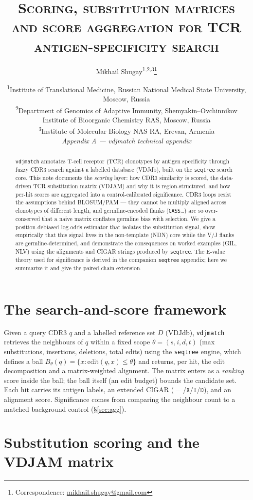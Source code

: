 \documentclass[11pt]{article}
\title{\scshape Scoring, substitution matrices and score aggregation for
TCR antigen-specificity search}
\author{Mikhail Shugay\textsuperscript{1,2,3}\thanks{Correspondence:
  \href{mailto:mikhail.shugay@gmail.com}{mikhail.shugay@gmail.com}}}
\date{%
  \small
  \textsuperscript{1}Institute of Translational Medicine, Russian National Medical State University, Moscow, Russia\\
  \textsuperscript{2}Department of Genomics of Adaptive Immunity, Shemyakin--Ovchinnikov Institute of Bioorganic Chemistry RAS, Moscow, Russia\\
  \textsuperscript{3}Institute of Molecular Biology NAS RA, Erevan, Armenia\\[6pt]
  \normalsize\textit{Appendix A --- vdjmatch technical appendix}%
}
\theoremstyle{oldplain}
\theoremstyle{oldrem}
\newcommand{\ball}[2]{B_{#1}(#2)}
\begin{document}
\maketitle

\begin{abstract}
\noindent
\texttt{vdjmatch} annotates T-cell receptor (TCR) clonotypes by antigen specificity through fuzzy
CDR3 search against a labelled database (VDJdb), built on the \texttt{seqtree} search core. This note
documents the \emph{scoring} layer: how CDR3 similarity is scored, the data-driven TCR substitution
matrix (VDJAM) and why it is region-structured, and how per-hit scores are aggregated into a
control-calibrated significance. CDR3 loops resist the assumptions behind BLOSUM/PAM --- they cannot
be multiply aligned across clonotypes of different length, and germline-encoded flanks
(\texttt{CASS}\dots) are so over-conserved that a naive matrix conflates germline bias with selection.
We give a position-debiased log-odds estimator that isolates the substitution signal, show
empirically that this signal lives in the non-template (NDN) core while the V/J flanks are
germline-determined, and demonstrate the consequences on worked examples (GIL, NLV) using the
alignments and CIGAR strings produced by \texttt{seqtree}. The E-value theory used for significance is
derived in the companion \texttt{seqtree} appendix; here we summarize it and give the paired-chain
extension.
\end{abstract}

\section{The search-and-score framework}
Given a query CDR3 $q$ and a labelled reference set $D$ (VDJdb), \texttt{vdjmatch} retrieves the
neighbours of $q$ within a fixed scope $\theta=(s,i,d,t)$ (max substitutions, insertions, deletions,
total edits) using the \texttt{seqtree} engine, which defines a ball $\ball{\theta}{q}=\{x:
\mathrm{edit}(q,x)\le\theta\}$ and returns, per hit, the edit decomposition and a matrix-weighted
alignment. The matrix enters as a \emph{ranking} score inside the ball; the ball itself (an edit
budget) bounds the candidate set. Each hit carries its antigen labels, an extended CIGAR
($=$/$\mathtt{X}$/$\mathtt{I}$/$\mathtt{D}$), and an alignment score. Significance comes from comparing
the neighbour count to a matched background control (\S\ref{sec:agg}).

\section{Substitution scoring and the VDJAM matrix}\label{sec:vdjam}
\end{document}
